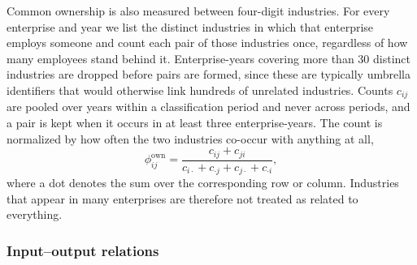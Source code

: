 \documentclass[9pt,twoside]{pnas-new}
\begin{document}
Common ownership is also measured between four-digit industries. For every
enterprise and year we list the distinct industries in which that enterprise
employs someone and count each pair of those industries once, regardless of how
many employees stand behind it. Enterprise-years covering more than 30
distinct industries are dropped before pairs are formed, since these are
typically umbrella identifiers that would otherwise link hundreds of unrelated
industries. Counts $c_{ij}$ are pooled over years within a classification
period and never across periods, and a pair is kept when it occurs in at least
three enterprise-years. The count is normalized by how often the two
industries co-occur with anything at all,
\begin{equation}
\phi^{\mathrm{own}}_{ij}=
\frac{c_{ij}+c_{ji}}
{c_{i\cdot}+c_{\cdot j}+c_{j\cdot}+c_{\cdot i}},
\label{eq:ownership-relatedness}
\end{equation}
where a dot denotes the sum over the corresponding row or column. Industries
that appear in many enterprises are therefore not treated as related to
everything.

\subsubsection{Input--output relations}
\label{subsubsec:input-output-relations}
\end{document}
